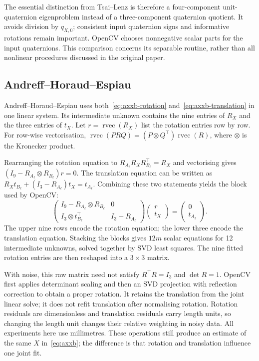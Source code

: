\documentclass[12pt,a4paper]{article}
\begin{document}
The essential distinction from Tsai--Lenz is therefore a four-component unit-quaternion eigenproblem instead of a three-component quaternion quotient. It avoids division by $q_{X,0}$; consistent input quaternion signs and informative rotations remain important. OpenCV chooses nonnegative scalar parts for the input quaternions. This comparison concerns its separable routine, rather than all nonlinear procedures discussed in the original paper. \cite{horaud,opencvsource}

\subsection{Andreff--Horaud--Espiau}
Andreff--Horaud--Espiau uses both~\eqref{eq:axxb-rotation} and~\eqref{eq:axxb-translation} in one linear system. Its intermediate unknown contains the nine entries of $R_X$ and the three entries of $t_X$. Let $r=\operatorname{rvec}(R_X)$ list the rotation entries row by row. For row-wise vectorisation, $\operatorname{rvec}(PRQ)=(P\otimes Q^\top)\operatorname{rvec}(R)$, where $\otimes$ is the Kronecker product.

Rearranging the rotation equation to $R_{A_\ell}R_XR_{B_\ell}^\top=R_X$ and vectorising gives $(I_9-R_{A_\ell}\otimes R_{B_\ell})r=0$. The translation equation can be written as $R_Xt_{B_\ell}+(I_3-R_{A_\ell})t_X=t_{A_\ell}$. Combining these two statements yields the block used by OpenCV:
\begin{equation}\label{eq:andreff}
\begin{pmatrix}
I_9-R_{A_\ell}\otimes R_{B_\ell}&0\\
I_3\otimes t_{B_\ell}^\top&I_3-R_{A_\ell}
\end{pmatrix}
\begin{pmatrix}r\\t_X\end{pmatrix}
=
\begin{pmatrix}0\\t_{A_\ell}\end{pmatrix}.
\end{equation}
The upper nine rows encode the rotation equation; the lower three encode the translation equation. Stacking the blocks gives $12m$ scalar equations for 12 intermediate unknowns, solved together by SVD least squares. The nine fitted rotation entries are then reshaped into a $3\times3$ matrix.

With noise, this raw matrix need not satisfy $R^\top R=I_3$ and $\det R=1$. OpenCV first applies determinant scaling and then an SVD projection with reflection correction to obtain a proper rotation. It retains the translation from the joint linear solve; it does not refit translation after normalising rotation. Rotation residuals are dimensionless and translation residuals carry length units, so changing the length unit changes their relative weighting in noisy data. All experiments here use millimetres. These operations still produce an estimate of the same $X$ in~\eqref{eq:axxb}; the difference is that rotation and translation influence one joint fit. \cite{andreff,opencvsource}
\end{document}
